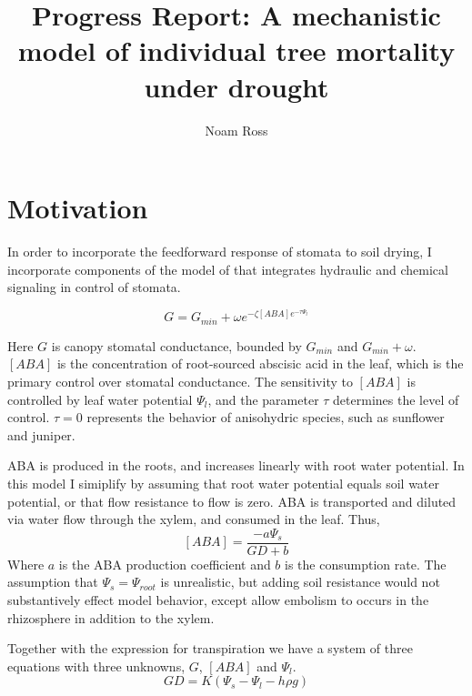 \documentclass[12pt]{amsart}
\title{Progress Report: A mechanistic model of individual tree mortality under drought}
\author{Noam Ross}
\begin{document}


\maketitle


\section{Motivation}



In order to incorporate the feedforward response of stomata to soil drying, I incorporate components of the model of \citet{Tardieu1993a} that integrates hydraulic and chemical signaling in control of stomata. 

\begin{equation}\label{Tardieu1}
G = G_{min} + \omega e^{-\zeta [ABA] e^{-\tau \Psi_l}}
\end{equation}

Here $G$ is canopy stomatal conductance, bounded by $G_{min}$ and $G_{min} + \omega$.  $[ABA]$ is the concentration of root-sourced abscisic acid in the leaf, which is the primary control over stomatal conductance.  The sensitivity to $[ABA]$ is controlled by leaf water potential $\Psi_l$, and the parameter $\tau$ determines the level of control.   $\tau = 0$ represents the behavior of anisohydric species, such as sunflower and juniper.

ABA is produced in the roots, and increases linearly with root water potential.  In this model I simiplify by assuming that root water potential equals soil water potential, or that flow resistance to flow is zero.  ABA is transported and diluted via water flow through the xylem, and consumed in the leaf.  Thus,
\begin{equation}\label{Tardieu2}
[ABA] = \frac{-a \Psi_s}{GD + b}
\end{equation}
Where $a$ is the ABA production coefficient and $b$ is the consumption rate.  The assumption that $\Psi_s = \Psi_{root}$ is unrealistic, but adding soil resistance would not substantively effect model behavior, except allow embolism to occurs in the rhizosphere in addition to the xylem.

Together with the expression for transpiration we have a system of three equations with three unknowns, $G$, $[ABA]$ and $\Psi_l$.
\begin{equation}\label{GD}
GD = K(\Psi_s - \Psi_l - h\rho g)
\end{equation}
\end{document}
